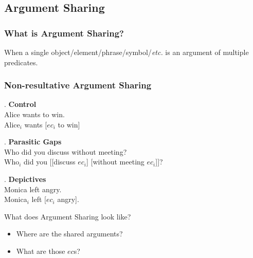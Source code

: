 \documentclass{article}
\begin{document}
\subsection{Argument Sharing}
\begin{frame}
  \frametitle{What is Argument Sharing?}
  When a single object/element/phrase/symbol/\textit{etc.} is an argument of multiple predicates.
\end{frame}
\begin{frame}
  \frametitle{Non-resultative Argument Sharing}
  \pause
  \ex. \textbf{Control}\\
    {\rm Alice wants to win.}\\
    Alice$_i$ wants [$ec_i$ to win]

  \pause
\ex. \textbf{Parasitic Gaps}\\
    {\rm Who did you discuss without meeting?}\\
    Who$_i$ did you [[discuss $ec_i$] [without meeting $ec_i$]]?
    
    \pause
    \ex. \textbf{Depictives}\\
    {\rm Monica left angry.}\\
    Monica$_i$ left [$ec_i$ angry].

\end{frame}
\begin{frame}
  {What does Argument Sharing look like?}
  \begin{itemize}
    \item Where are the shared arguments?
    \item What are those $ec$s?
  \end{itemize}
  
\end{frame}


\end{document}
